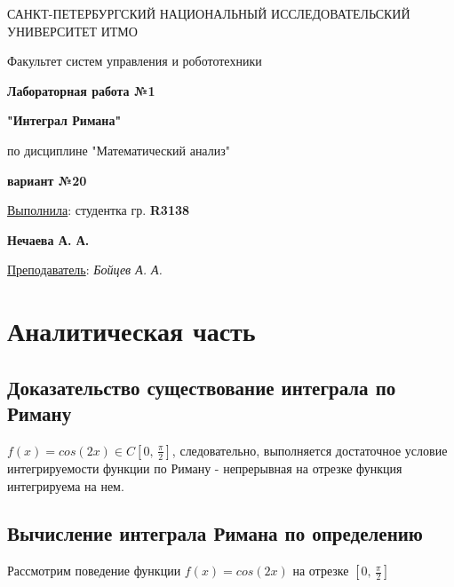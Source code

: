 \documentclass[a5paper, 10pt]{article}
\theoremstyle{definition}
\theoremstyle{plain}
\theoremstyle{remark}
\newcommand*{\titlePage}{
	\thispagestyle{title}
	\begingroup
	\begin{center}
		\vspace*{6ex}
		
		{\small
			САНКТ-ПЕТЕРБУРГСКИЙ НАЦИОНАЛЬНЫЙ ИССЛЕДОВАТЕЛЬСКИЙ УНИВЕРСИТЕТ ИТМО
		}
		
		\vspace*{2ex}
		
		{\normalsize
			Факультет систем управления и робототехники
		}
		
		\vspace*{15ex}
		
		{\Large \bfseries 
			Лабораторная работа  №1
		}

                     \vspace*{2ex}
{\Large \bfseries 
			"Интеграл Римана"
		}

                     \vspace*{2ex}
		
		{\normalsize
			по дисциплине "Математический анализ"
		}
                     \vspace*{2ex}
		
		{\normalsize \bfseries
			вариант №20
		}
	\end{center}
	\vspace*{20ex}
	\begin{flushright}
		{\large 
			\underline{Выполнила}: студентка гр. \textbf{R3138}\\
			\begin{flushright}
				\textbf{Нечаева А. А.}\\
			\end{flushright}
		}
		
		\vspace*{5ex}
		
		{\large 
			\underline{Преподаватель}: \textit{Бойцев А. А.}
		}
	\end{flushright}	
	\newpage
	\setcounter{page}{2}
	\endgroup}
\begin{document}
           \newpage
	\titlePage
	\pagestyle{style}
           \section{Аналитическая часть}
           \subsection{Доказательство существование интеграла по Риману}
$f(x) = cos(2x) \in C[0,\, \frac{\pi}{2}]$, следовательно, выполняется достаточное условие интегрируемости функции по Риману - непрерывная на отрезке функция интегрируема на нем. \\	
	\subsection{Вычисление интеграла Римана по определению}
Рассмотрим поведение функции $f(x) = cos(2x)$ на отрезке $[0,\, \frac{\pi}{2}]$ 
\end{document}
